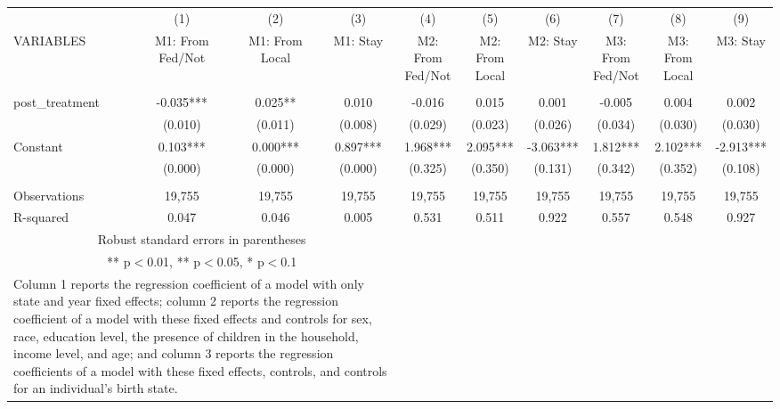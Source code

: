 \begin{tabular}{lccccccccc} \hline
 & (1) & (2) & (3) & (4) & (5) & (6) & (7) & (8) & (9) \\
VARIABLES & M1: From Fed/Not & M1: From Local & M1: Stay & M2: From Fed/Not & M2: From Local & M2: Stay & M3: From Fed/Not & M3: From Local & M3: Stay \\ \hline
 &  &  &  &  &  &  &  &  &  \\
post\_treatment & -0.035*** & 0.025** & 0.010 & -0.016 & 0.015 & 0.001 & -0.005 & 0.004 & 0.002 \\
 & (0.010) & (0.011) & (0.008) & (0.029) & (0.023) & (0.026) & (0.034) & (0.030) & (0.030) \\
Constant & 0.103*** & 0.000*** & 0.897*** & 1.968*** & 2.095*** & -3.063*** & 1.812*** & 2.102*** & -2.913*** \\
 & (0.000) & (0.000) & (0.000) & (0.325) & (0.350) & (0.131) & (0.342) & (0.352) & (0.108) \\
 &  &  &  &  &  &  &  &  &  \\
Observations & 19,755 & 19,755 & 19,755 & 19,755 & 19,755 & 19,755 & 19,755 & 19,755 & 19,755 \\
 R-squared & 0.047 & 0.046 & 0.005 & 0.531 & 0.511 & 0.922 & 0.557 & 0.548 & 0.927 \\ \hline
\multicolumn{4}{c}{\small Robust standard errors in parentheses} \\
\multicolumn{4}{c}{\small *** p$<$0.01, ** p$<$0.05, * p$<$0.1} \\
\multicolumn{4}{p{0.8\linewidth}}{\small Column 1 reports the
regression coefficient of a model with only state and year fixed effects; column 2 reports the
regression coefficient of a model with these fixed effects and controls for sex, race, education
level, the presence of children in the household, income level, and age; and column 3 reports
the regression coefficients of a model with these fixed effects, controls, and controls for an
individual’s birth state.} \\
\end{tabular}
